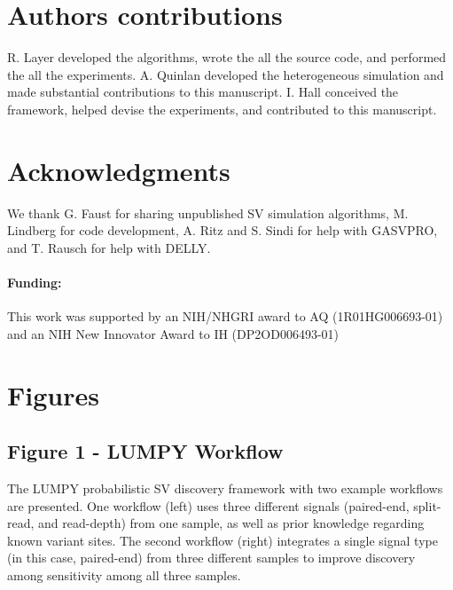 \documentclass[10pt]{bmc_article}
\def\texttt{[image: ]}
\newenvironment{bmcformat}{\begin{raggedright}\baselineskip20pt\sloppy\setboolean{publ}{false}}{\end{raggedright}\baselineskip20pt\sloppy}
\begin{document}
\begin{bmcformat}
\section*{Authors contributions}
R. Layer developed the algorithms, wrote the all the source code, and performed
the all the experiments.  A. Quinlan developed the heterogeneous simulation and
made substantial contributions to this manuscript.  I. Hall conceived the
framework, helped devise the experiments, and contributed to this manuscript.

\section*{Acknowledgments}
We thank G. Faust for sharing unpublished SV simulation algorithms, M. Lindberg
for code development, A. Ritz and S. Sindi for help with GASVPRO, and T. Rausch
for help with DELLY.

\paragraph{Funding:} This work was supported by an NIH/NHGRI award to
AQ (1R01HG006693-01) and an NIH New Innovator Award to IH (DP2OD006493-01)

%
%

{
   }



\section*{Figures}
\subsection*{Figure 1 - LUMPY Workflow}
The LUMPY probabilistic SV discovery framework with two example
workflows are presented. One workflow (left) uses three different signals
(paired-end, split-read, and read-depth) from one sample, as well as prior
knowledge regarding known variant sites. The second workflow (right) integrates
a single signal type (in this case, paired-end) from three different samples to
improve discovery among sensitivity among all three samples.


\end{bmcformat}
\end{document}
